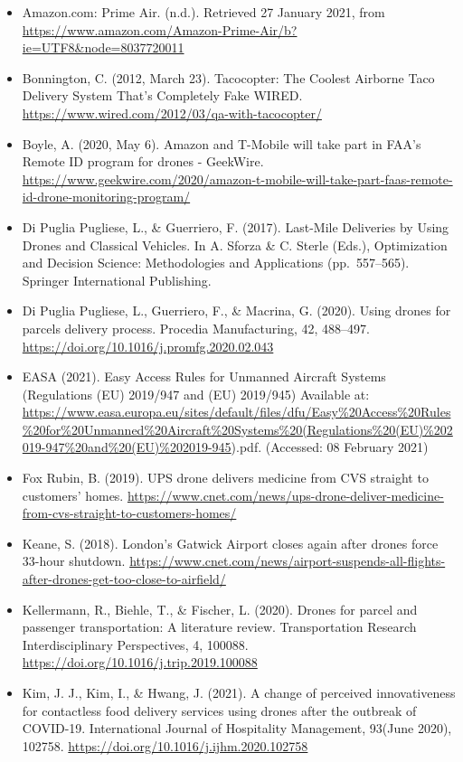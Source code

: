 \documentclass[
]{book}
\providecommand{\tightlist}{%
  \setlength{\itemsep}{0pt}\setlength{\parskip}{0pt}}
\begin{document}
\begin{itemize}
\tightlist
\item
  Amazon.com: Prime Air. (n.d.). Retrieved 27 January 2021, from \url{https://www.amazon.com/Amazon-Prime-Air/b?ie=UTF8\&node=8037720011}
\item
  Bonnington, C. (2012, March 23). Tacocopter: The Coolest Airborne Taco Delivery System That's Completely Fake \textbar{} WIRED. \url{https://www.wired.com/2012/03/qa-with-tacocopter/}
\item
  Boyle, A. (2020, May 6). Amazon and T-Mobile will take part in FAA's Remote ID program for drones - GeekWire. \url{https://www.geekwire.com/2020/amazon-t-mobile-will-take-part-faas-remote-id-drone-monitoring-program/}
\item
  Di Puglia Pugliese, L., \& Guerriero, F. (2017). Last-Mile Deliveries by Using Drones and Classical Vehicles. In A. Sforza \& C. Sterle (Eds.), Optimization and Decision Science: Methodologies and Applications (pp.~557--565). Springer International Publishing.
\item
  Di Puglia Pugliese, L., Guerriero, F., \& Macrina, G. (2020). Using drones for parcels delivery process. Procedia Manufacturing, 42, 488--497. \url{https://doi.org/10.1016/j.promfg.2020.02.043}
\item
  EASA (2021). Easy Access Rules for Unmanned Aircraft Systems (Regulations (EU) 2019/947 and (EU) 2019/945) Available at: \url{https://www.easa.europa.eu/sites/default/files/dfu/Easy\%20Access\%20Rules\%20for\%20Unmanned\%20Aircraft\%20Systems\%20(Regulations\%20(EU)\%202019-947\%20and\%20(EU)\%202019-945}).pdf. (Accessed: 08 February 2021)
\item
  Fox Rubin, B. (2019). UPS drone delivers medicine from CVS straight to customers' homes. \url{https://www.cnet.com/news/ups-drone-deliver-medicine-from-cvs-straight-to-customers-homes/}
\item
  Keane, S. (2018). London's Gatwick Airport closes again after drones force 33-hour shutdown. \url{https://www.cnet.com/news/airport-suspends-all-flights-after-drones-get-too-close-to-airfield/}
\item
  Kellermann, R., Biehle, T., \& Fischer, L. (2020). Drones for parcel and passenger transportation: A literature review. Transportation Research Interdisciplinary Perspectives, 4, 100088. \url{https://doi.org/10.1016/j.trip.2019.100088}
\item
  Kim, J. J., Kim, I., \& Hwang, J. (2021). A change of perceived innovativeness for contactless food delivery services using drones after the outbreak of COVID-19. International Journal of Hospitality Management, 93(June 2020), 102758. \url{https://doi.org/10.1016/j.ijhm.2020.102758}

\end{itemize}
\end{document}
